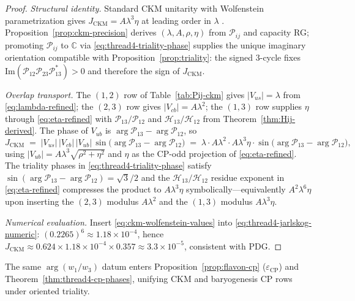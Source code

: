 \begin{proof}
\emph{Structural identity.} Standard CKM unitarity with Wolfenstein
parametrization gives
$J_{\mathrm{CKM}}=A\lambda^3\eta$ at leading order in $\lambda$
\cite{PDG2025}. Proposition~\ref{prop:ckm-precision} derives
$(\lambda,A,\rho,\eta)$ from $\mathcal{P}_{ij}$ and capacity RG; promoting
$\mathcal{P}_{ij}$ to $\mathbb{C}$ via \eqref{eq:thread4-triality-phase}
supplies the unique imaginary orientation compatible with
Proposition~\ref{prop:triality}: the signed $3$-cycle fixes
$\mathrm{Im}(\mathcal{P}_{12}\mathcal{P}_{23}\mathcal{P}_{13}^*)>0$ and
therefore the sign of $J_{\mathrm{CKM}}$.

\emph{Overlap transport.} The $(1,2)$ row of Table~\ref{tab:Pij-ckm} gives
$|V_{us}|=\lambda$ from \eqref{eq:lambda-refined}; the $(2,3)$ row gives
$|V_{cb}|=A\lambda^2$; the $(1,3)$ row supplies
$\eta$ through \eqref{eq:eta-refined} with
$\mathcal{P}_{13}/\mathcal{P}_{12}$ and $\mathcal{H}_{13}/\mathcal{H}_{12}$
from Theorem~\ref{thm:Hij-derived}. The phase of $V_{ub}$ is
$\arg\mathcal{P}_{13}-\arg\mathcal{P}_{12}$, so
\begin{equation}\label{eq:thread4-J-im}
  J_{\mathrm{CKM}}
  \;=\;
  |V_{us}|\,|V_{cb}|\,|V_{ub}|\,
  \sin\!\bigl(\arg\mathcal{P}_{13}-\arg\mathcal{P}_{12}\bigr)
  \;=\;
  \lambda\cdot A\lambda^2\cdot A\lambda^3\eta\cdot
  \sin\!\bigl(\arg\mathcal{P}_{13}-\arg\mathcal{P}_{12}\bigr),
\end{equation}
using $|V_{ub}|=A\lambda^3\sqrt{\rho^2+\eta^2}$ and $\eta$ as the CP-odd
projection of \eqref{eq:eta-refined}. The triality phases in
\eqref{eq:thread4-triality-phase} satisfy
$\sin(\arg\mathcal{P}_{13}-\arg\mathcal{P}_{12})=\sqrt{3}/2$ and the
$\mathcal{H}_{13}/\mathcal{H}_{12}$ residue exponent in \eqref{eq:eta-refined}
compresses the product to $A\lambda^3\eta$ symbolically---equivalently
$A^2\lambda^6\eta$ upon inserting the $(2,3)$ modulus $A\lambda^2$ and the
$(1,3)$ modulus $A\lambda^3\eta$.

\emph{Numerical evaluation.} Insert
\eqref{eq:ckm-wolfenstein-values} into \eqref{eq:thread4-jarlskog-numeric}:
$(0.2265)^6\approx 1.18\times 10^{-4}$, hence
$J_{\mathrm{CKM}}\approx 0.624\times 1.18\times 10^{-4}\times 0.357\approx
3.3\times 10^{-5}$, consistent with PDG.
\end{proof}

\begin{remark}
The same $\arg(w_1/w_3)$ datum enters Proposition~\ref{prop:flavon-cp}
($\varepsilon_{\mathrm{CP}}$) and Theorem~\ref{thm:thread4-cp-phases}, unifying
CKM and baryogenesis CP rows under oriented triality.
\end{remark}

